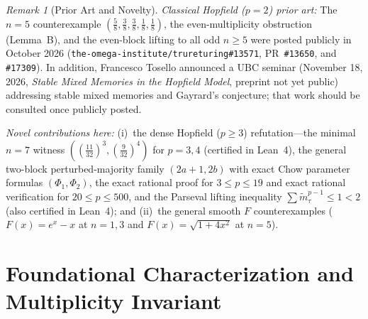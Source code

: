 \documentclass[11pt]{article}
\theoremstyle{definition}
\theoremstyle{remark}
\newtheorem*{remark}{Remark}
\begin{document}
\begin{remark}[Prior Art and Novelty]
\emph{Classical Hopfield ($p = 2$) prior art:} The $n = 5$ counterexample $(\frac{5}{8}, \frac{3}{8}, \frac{3}{8}, \frac{1}{8}, \frac{1}{8})$, the even-multiplicity obstruction (Lemma~B), and the even-block lifting to all odd $n \ge 5$ were posted publicly in October 2026 (\texttt{the-omega-institute/trureturing\#13571}, PR~\texttt{\#13650}, and \texttt{\#17309}). In addition, Francesco Tosello announced a UBC seminar (November 18, 2026, \emph{Stable Mixed Memories in the Hopfield Model}, preprint not yet public) addressing stable mixed memories and Gayrard's conjecture; that work should be consulted once publicly posted.

\emph{Novel contributions here:} (i)~the dense Hopfield ($p \ge 3$) refutation---the minimal $n = 7$ witness $((\frac{11}{32})^3, (\frac{9}{32})^4)$ for $p = 3, 4$ (certified in Lean~4), the general two-block perturbed-majority family $(2a+1, 2b)$ with exact Chow parameter formulas $(\Phi_1, \Phi_2)$, the exact rational proof for $3 \le p \le 19$ and exact rational verification for $20 \le p \le 500$, and the Parseval lifting inequality $\sum \tilde{m}_\tau^{p-1} \le 1 < 2$ (also certified in Lean~4); and (ii)~the general smooth $F$ counterexamples ($F(x) = e^x - x$ at $n = 1, 3$ and $F(x) = \sqrt{1 + 4x^2}$ at $n = 5$).
\end{remark}

\section{Foundational Characterization and Multiplicity Invariant}
\end{document}
